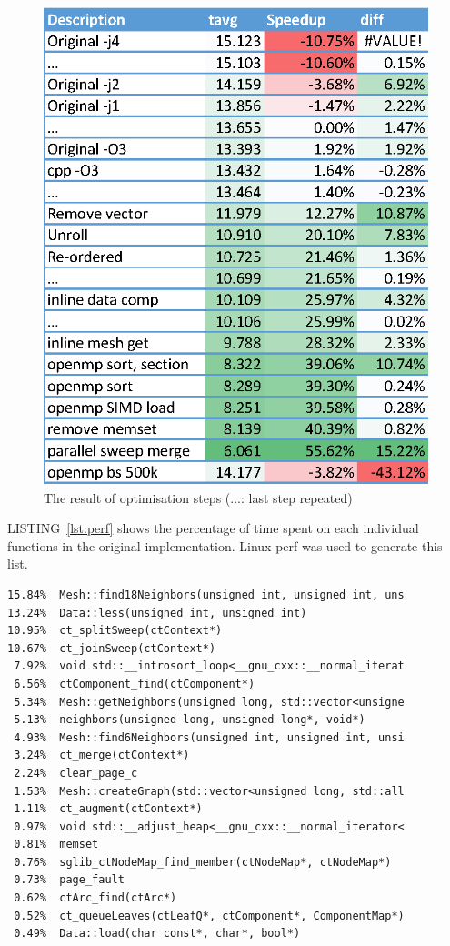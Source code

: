 \documentclass[conference]{IEEEtran}
\newcommand{\lref}[1]{LISTING~\ref{#1}}
\begin{document}
\begin{figure}[t]
    \centering
    \includegraphics[width=0.8\columnwidth]{data_log}
    \caption{The result of optimisation steps (...: last step repeated)}
    \label{fig:log}
\end{figure}

\lref{lst:perf} shows the percentage of time spent on each individual functions in the original implementation. Linux perf was used to generate this list.

\begin{lstlisting}[float,floatplacement=t,language={},label=lst:perf,captionpos=b,caption={Profiling of the original implementation}]
15.84%  Mesh::find18Neighbors(unsigned int, unsigned int, uns
13.24%  Data::less(unsigned int, unsigned int)
10.95%  ct_splitSweep(ctContext*)
10.67%  ct_joinSweep(ctContext*)
 7.92%  void std::__introsort_loop<__gnu_cxx::__normal_iterat
 6.56%  ctComponent_find(ctComponent*)
 5.34%  Mesh::getNeighbors(unsigned long, std::vector<unsigne
 5.13%  neighbors(unsigned long, unsigned long*, void*)
 4.93%  Mesh::find6Neighbors(unsigned int, unsigned int, unsi
 3.24%  ct_merge(ctContext*)
 2.24%  clear_page_c
 1.53%  Mesh::createGraph(std::vector<unsigned long, std::all
 1.11%  ct_augment(ctContext*)
 0.97%  void std::__adjust_heap<__gnu_cxx::__normal_iterator<
 0.81%  memset
 0.76%  sglib_ctNodeMap_find_member(ctNodeMap*, ctNodeMap*)
 0.73%  page_fault
 0.62%  ctArc_find(ctArc*)
 0.52%  ct_queueLeaves(ctLeafQ*, ctComponent*, ComponentMap*)
 0.49%  Data::load(char const*, char*, bool*)
\end{lstlisting}
\end{document}
